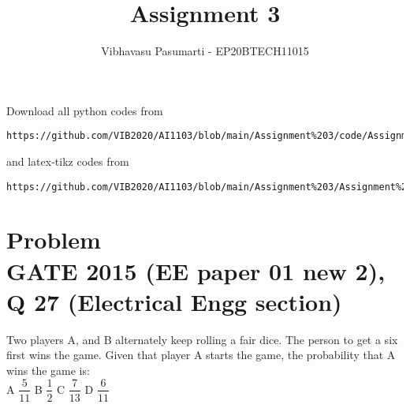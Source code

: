 \documentclass[journal,12pt,twocolumn]{IEEEtran}
\theoremstyle{remark}
\numberwithin{equation}{subsection}
\renewcommand{\thefigure}{\theproblem}
\begin{document}
\title{Assignment 3}
\author{Vibhavasu Pasumarti - EP20BTECH11015}
\maketitle
\newpage
\bigskip
\renewcommand{\thefigure}{\theenumi}
\renewcommand{\thetable}{\theenumi}
Download all python codes from 
\begin{lstlisting}
https://github.com/VIB2020/AI1103/blob/main/Assignment%203/code/Assignment%203.py
\end{lstlisting}
%
and latex-tikz codes from 
%
\begin{lstlisting}
https://github.com/VIB2020/AI1103/blob/main/Assignment%203/Assignment%203.pdf
\end{lstlisting}
\section{\Large Problem \\ \large GATE 2015 (EE paper 01 new 2), Q 27 (Electrical Engg section)}
Two players A, and B alternately keep rolling a fair dice. The person to get a six first wins the game. Given that player A starts the game, the probability that A wins the game is:\\[5pt]
    A $\dfrac{5}{11}$ \hspace{1cm}
    B $\dfrac{1}{2}$ \hspace{1cm}
    C $\dfrac{7}{13}$ \hspace{1cm}
    D $\dfrac{6}{11}$ \hspace{1cm}
\end{document}

